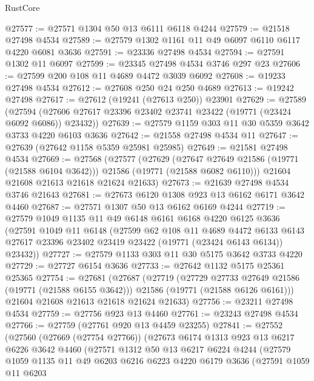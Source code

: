 \begin{lexlean}{RustCore}
\begin{coremodule}
@27577 := @27571 @1304 @50 @13 @6111 @6118 @4244
@27579 := @21518 @27498 @4534
@27589 := @27579 @1302 @1161 @11 @49 @6097 @6110 @6117 @4220 @6081 @3636
@27591 := @23336 @27498 @4534
@27594 := @27591 @1302 @11 @6097
@27599 := @23345 @27498 @4534 @3746 @297 @23
@27606 := @27599 @200 @108 @11 @4689 @4472 @3039 @6092
@27608 := @19233 @27498 @4534
@27612 := @27608 @250 @24 @250 @4689
@27613 := @19242 @27498
@27617 := @27612 (@19241 (@27613 @250)) @23901
@27629 := @27589
    (@27594 (@27606 @27617 @23396 @23402 @23741 @23422 (@19771 (@23424 @6092 @6086)) @23432))
@27639 := @27579 @1159 @303 @11 @30 @5359 @3642 @3733 @4220 @6103 @3636
@27642 := @21558 @27498 @4534 @11
@27647 := @27639 (@27642 @1158 @5359 @25981 @25985)
@27649 := @21581 @27498 @4534
@27669 := @27568
    (@27577
      (@27629
        (@27647 @27649 @21586 (@19771 (@21588 @6104 @3642)))
        @21586
        (@19771 (@21588 @6082 @6110)))
      @21604
      @21608
      @21613
      @21618
      @21624
      @21633)
@27673 := @21639 @27498 @4534 @3746 @21643
@27681 := @27673 @6120 @1308 @923 @13 @6162 @6171 @3642 @4460
@27687 := @27571 @1307 @50 @13 @6162 @6169 @4244
@27719 := @27579
    @1049
    @1135
    @11
    @49
    @6148
    @6161
    @6168
    @4220
    @6125
    @3636
    (@27591
      @1049
      @11
      @6148
      (@27599
        @62
        @108
        @11
        @4689
        @4472
        @6133
        @6143
        @27617
        @23396
        @23402
        @23419
        @23422
        (@19771 (@23424 @6143 @6134))
        @23432))
@27727 := @27579 @1133 @303 @11 @30 @5175 @3642 @3733 @4220
@27729 := @27727 @6154 @3636
@27733 := @27642 @1132 @5175 @25361 @25365
@27754 := @27681
    (@27687
      (@27719
        (@27729 @27733 @27649 @21586 (@19771 (@21588 @6155 @3642)))
        @21586
        (@19771 (@21588 @6126 @6161)))
      @21604
      @21608
      @21613
      @21618
      @21624
      @21633)
@27756 := @23211 @27498 @4534
@27759 := @27756 @923 @13 @4460
@27761 := @23243 @27498 @4534
@27766 := @27759 (@27761 @920 @13 @4459 @23255)
@27841 := @27552
    (@27560
      (@27669 (@27754 @27766))
      (@27673
        @6174
        @1313
        @923
        @13
        @6217
        @6226
        @3642
        @4460
        (@27571
          @1312
          @50
          @13
          @6217
          @6224
          @4244
          (@27579
            @1059
            @1135
            @11
            @49
            @6203
            @6216
            @6223
            @4220
            @6179
            @3636
            (@27591
              @1059
              @11
              @6203

\end{coremodule}
\end{lexlean}
